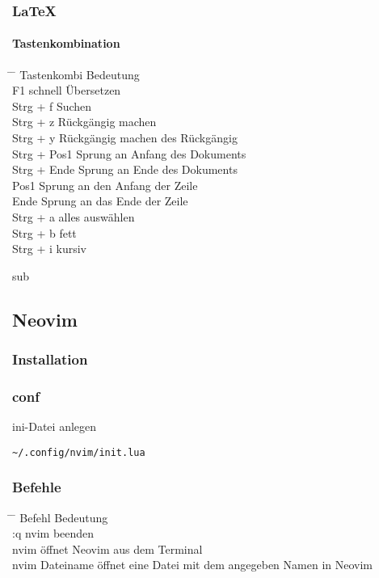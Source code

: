 \documentclass[10pt,a4paper,twoside]{book}
\begin{document}
\subsubsection{LaTeX}
\paragraph{Tastenkombination}
\begin{tabbing}
\hspace*{1mm} \=\hspace*{30mm} \= \kill
\> Tastenkombi \> Bedeutung  \\
\> F1 \> schnell Übersetzen \\
\> Strg + f \> Suchen \\
\> Strg + z \> Rückgängig machen\\
\> Strg + y \> Rückgängig machen des Rückgängig\\
\> Strg + Pos1 \> Sprung an Anfang des Dokuments\\
\> Strg + Ende \> Sprung an Ende des Dokuments\\
\> Pos1 \> Sprung an den Anfang der Zeile\\
\> Ende \> Sprung an das Ende der Zeile\\ 			
\> Strg + a \> alles auswählen\\
\> Strg + b \> fett\\
\> Strg + i \> kursiv\\
\end{tabbing}
sub
\subsection{Neovim}
\subsubsection{Installation}
\subsubsection{conf}
ini-Datei anlegen
\begin{verbatim}
~/.config/nvim/init.lua
\end{verbatim}
\subsubsection{Befehle}
\begin{tabbing}
\hspace*{1mm} \=\hspace*{30mm} \= \kill
\> Befehl \> Bedeutung  \\
\> :q \> nvim beenden\\
\> nvim \> öffnet Neovim aus dem Terminal\\
\> nvim Dateiname \> öffnet eine Datei mit dem angegeben Namen in Neovim\\ 
\end{tabbing}
\end{document}
